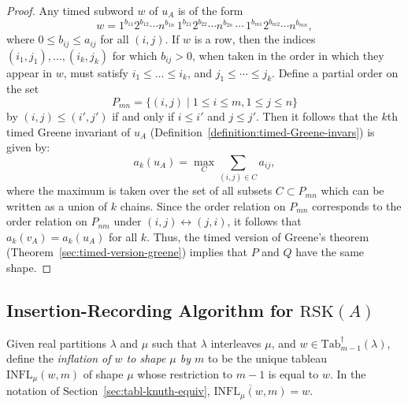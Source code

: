 \documentclass[10pt]{amsproc}
\theoremstyle{definition}
\theoremstyle{remark}
\newcommand{\ttab}{\mathrm{Tab}^\dagger}
\newcommand{\rsk}{\mathrm{RSK}}
\newcommand{\infl}{\mathrm{INFL}}
\begin{document}
\begin{proof}
  Any timed subword $w$ of $u_A$ is of the form
  \begin{displaymath}
    w=1^{b_{11}}2^{b_{12}}\dotsb n^{b_{1n}}\,1^{b_{21}}2^{b_{22}}\dotsb n^{b_{2n}}\,\dotsb \,1^{b_{m1}}2^{b_{m2}}\dotsb n^{b_{mn}},    
  \end{displaymath}
  where $0\leq b_{ij}\leq a_{ij}$ for all $(i,j)$.
  If $w$ is a row, then the indices $(i_1,j_1),\dotsc,(i_k,j_k)$ for which $b_{ij}>0$, when taken in the order in which they appear in $w$, must satisfy $i_1\leq \dotsc \leq i_k$, and $j_1\leq \dotsb \leq j_k$.
  Define a partial order on the set
  \begin{displaymath}
    P_{mn} = \{(i,j)\mid 1\leq i\leq m,1\leq j \leq n\}
  \end{displaymath}
  by $(i,j)\leq (i',j')$ if and only if $i\leq i'$ and $j\leq j'$.
  Then it follows that the $k$th timed Greene invariant of $u_A$ (Definition~\ref{definition:timed-Greene-invars}) is given by:
  \begin{displaymath}
    a_k(u_A) = \max_C \sum_{(i,j)\in C} a_{ij},
  \end{displaymath}
  where the maximum is taken over the set of all subsets $C\subset P_{mn}$ which can be written as a union of $k$ chains.
  Since the order relation on $P_{mn}$ corresponds to the order relation on $P_{nm}$ under $(i,j)\leftrightarrow (j,i)$, it follows that $a_k(v_A)=a_k(u_A)$ for all $k$.
  Thus, the timed version of Greene's theorem (Theorem~\ref{sec:timed-version-greene}) implies that $P$ and $Q$ have the same shape.
\end{proof}
\subsection{Insertion-Recording Algorithm for $\rsk(A)$}
\label{sec:insert-record-algor}
Given real partitions $\lambda$ and $\mu$ such that $\lambda$ interleaves $\mu$, and $w\in \ttab_{m-1}(\lambda)$, define the \emph{inflation of $w$ to shape $\mu$ by $m$} to be the unique tableau $\infl_\mu(w,m)$ of shape $\mu$ whose restriction to $m-1$ is equal to $w$.
In the notation of Section~\ref{sec:tabl-knuth-equiv}, $\overline{\infl_\mu(w,m)}=w$. 
\end{document}
